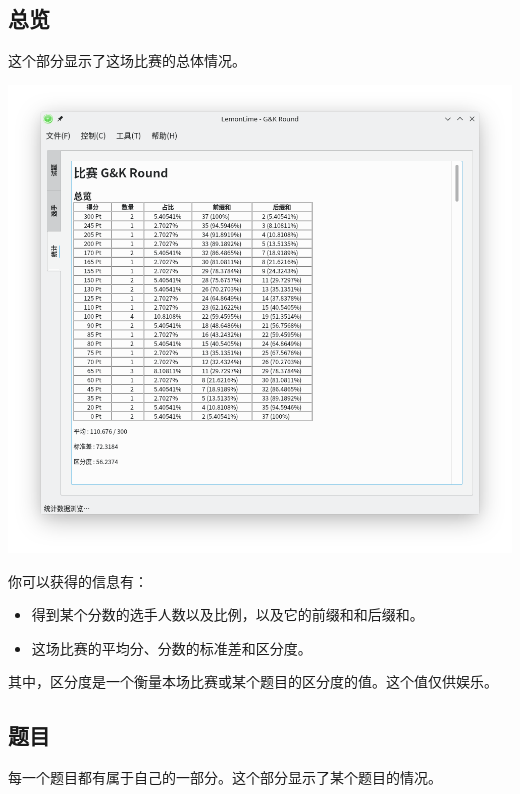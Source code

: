 \documentclass[UTF-8]{ctexart}
\begin{document}
		\subsection{总览}
		
			这个部分显示了这场比赛的总体情况。
		
			\begin{center}
			\includegraphics[scale=0.5]{pics/statistics.png}
			\end{center}
		
			你可以获得的信息有：
			
			\begin{itemize}
				\item 得到某个分数的选手人数以及比例，以及它的前缀和和后缀和。
				\item 这场比赛的平均分、分数的标准差和区分度。
			\end{itemize}
		
			其中，区分度是一个衡量本场比赛或某个题目的区分度的值。这个值仅供娱乐。
			
		
		\subsection{题目}
		
			每一个题目都有属于自己的一部分。这个部分显示了某个题目的情况。
			
\end{document}
